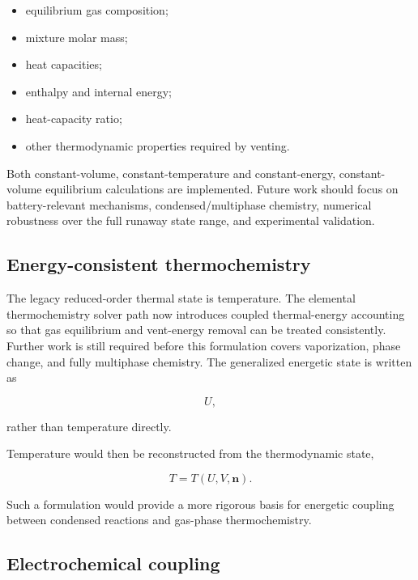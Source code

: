 \begin{itemize}
    \item equilibrium gas composition;
    \item mixture molar mass;
    \item heat capacities;
    \item enthalpy and internal energy;
    \item heat-capacity ratio;
    \item other thermodynamic properties required by venting.
\end{itemize}

Both constant-volume, constant-temperature and constant-energy,
constant-volume equilibrium calculations are implemented. Future work should
focus on battery-relevant mechanisms, condensed/multiphase chemistry, numerical
robustness over the full runaway state range, and experimental validation.


\subsection{Energy-consistent thermochemistry}

The legacy reduced-order thermal state is temperature. The elemental
thermochemistry solver path now introduces coupled thermal-energy accounting so
that gas equilibrium and vent-energy removal can be treated consistently.
Further work is still required before this formulation covers vaporization,
phase change, and fully multiphase chemistry. The generalized energetic state
is written as

\begin{equation}
    U,
\end{equation}

rather than temperature directly.

Temperature would then be reconstructed from the thermodynamic state,

\begin{equation}
    T
    =
    T
    \left(
        U,
        V,
        \mathbf{n}
    \right).
\end{equation}

Such a formulation would provide a more rigorous basis for energetic
coupling between condensed reactions and gas-phase thermochemistry.


\subsection{Electrochemical coupling}

